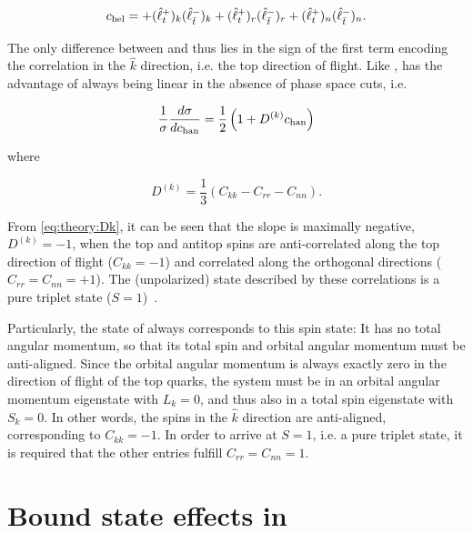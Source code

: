 \begin{equation}
    \label{eq:theory:chel_components}
    c_{\mathrm{hel}} = + (\hat{\ell}_t^+)_k (\hat{\ell}_{\bar{t}}^-)_k + (\hat{\ell}_t^+)_r (\hat{\ell}_{\bar{t}}^-)_r + (\hat{\ell}_t^+)_n (\hat{\ell}_{\bar{t}}^-)_n .
\end{equation}

The only difference between \chel and \chan thus lies in the sign of the first term encoding the correlation in the $\hat{k}$ direction, i.e. the top direction of flight.
Like \chel, \chan has the advantage of always being linear in the absence of phase space cuts, i.e.

\begin{equation}
    \frac{1}{\sigma} \frac{d \sigma}{d c_{\mathrm{han}}} = \frac{1}{2}\left( 1 + D^{(k)} c_{\mathrm{han}} \right)
\end{equation}

\noindent where~\cite{Maltoni:2024tul}

\begin{equation}
\label{eq:theory:Dk}
    D^{(k)} = \frac{1}{3} \left( C_{kk} - C_{rr} - C_{nn} \right) .
\end{equation}

From \cref{eq:theory:Dk}, it can be seen that the slope is maximally negative, $D^{(k)} = -1$, when the top and antitop spins are anti-correlated along the top direction of flight ($C_{kk} = -1$) and correlated along the orthogonal directions ($C_{rr} = C_{nn} = +1$). The (unpolarized) state described by these correlations is a pure triplet state ($S=1$)~\cite{Maltoni:2024tul}. 

Particularly, the  state of \ttbar always corresponds to this spin state: It has no total angular momentum, so that its total spin and orbital angular momentum must be anti-aligned. Since the orbital angular momentum is always exactly zero in the direction of flight of the top quarks, the \ttbar system must be in an orbital angular momentum eigenstate with $L_k = 0$, and thus also in a total spin eigenstate with $S_k = 0$. In other words, the spins in the $\hat{k}$ direction are anti-aligned, corresponding to $C_{kk} = -1$. In order to arrive at $S=1$, i.e. a pure triplet state, it is required that the other entries fulfill $C_{rr} = C_{nn} = 1$.



\section{Bound state effects in \ttbartitle}
\label{sec:theory:etat}


